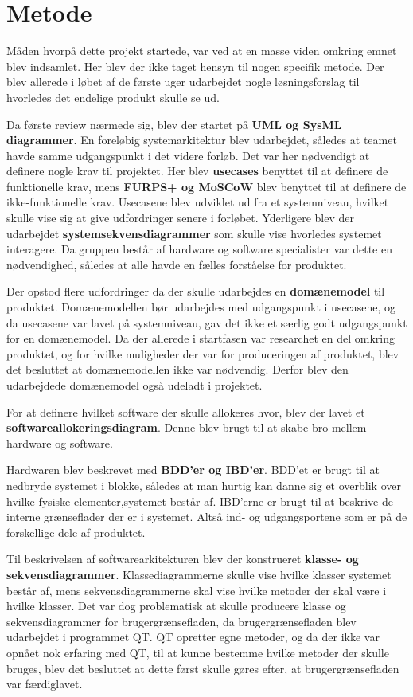 \chapter{Metode}

Måden hvorpå dette projekt startede, var ved at en masse viden omkring emnet blev indsamlet. Her blev der ikke taget hensyn til nogen specifik metode. Der blev allerede i løbet af de første uger udarbejdet nogle løsningsforslag til hvorledes det endelige produkt skulle se ud. 

Da første review nærmede sig, blev der startet på \textbf{UML og SysML diagrammer}. En foreløbig systemarkitektur blev udarbejdet, således at teamet havde samme udgangspunkt i det videre forløb. Det var her nødvendigt at definere nogle krav til projektet. Her blev \textbf{usecases} benyttet til at definere de funktionelle krav, mens \textbf{FURPS+ og MoSCoW} blev benyttet til at definere de ikke-funktionelle krav. Usecasene blev udviklet ud fra et systemniveau, hvilket skulle vise sig at give udfordringer senere i forløbet.
Yderligere blev der udarbejdet \textbf{systemsekvensdiagrammer} som skulle vise hvorledes systemet interagere. Da gruppen består af hardware og software specialister var dette en nødvendighed, således at alle havde en fælles forståelse for produktet.

Der opstod flere udfordringer da der skulle udarbejdes en \textbf{domænemodel} til produktet. Domænemodellen bør udarbejdes med udgangspunkt i usecasene, og da usecasene var lavet på systemniveau, gav det ikke et særlig godt udgangspunkt for en domænemodel. Da der allerede i startfasen var researchet en del omkring produktet, og for hvilke muligheder der var for produceringen af produktet, blev det besluttet at domænemodellen ikke var nødvendig. Derfor blev den udarbejdede domænemodel også udeladt i projektet.
 
For at definere hvilket software der skulle allokeres hvor, blev der lavet et \textbf{softwareallokeringsdiagram}. Denne blev brugt til at skabe bro mellem hardware og software.

Hardwaren blev beskrevet med \textbf{BDD’er og IBD’er}. BDD’et er brugt til at nedbryde systemet i blokke, således at man hurtig kan danne sig et overblik over hvilke fysiske elementer,systemet består af. 
IBD’erne er brugt til at beskrive de interne grænseflader der er i systemet. Altså ind- og udgangsportene som er på de forskellige dele af produktet.

Til beskrivelsen af softwarearkitekturen blev der konstrueret \textbf{klasse- og sekvensdiagrammer}. Klassediagrammerne skulle vise hvilke klasser systemet består af, mens sekvensdiagrammerne skal vise hvilke metoder der skal være i hvilke klasser. Det var dog problematisk at skulle producere klasse og sekvensdiagrammer for brugergrænsefladen, da brugergrænsefladen blev udarbejdet i programmet QT. QT opretter egne metoder, og da der ikke var opnået nok erfaring med QT, til at kunne bestemme hvilke metoder der skulle bruges, blev det besluttet at dette først skulle gøres efter, at brugergrænsefladen var færdiglavet.
